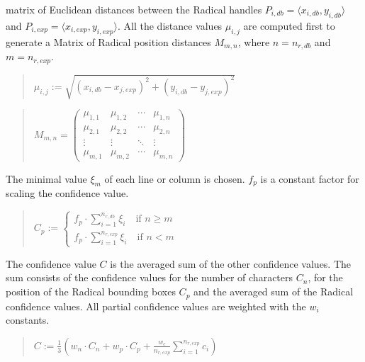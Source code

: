 matrix of Euclidean distances between the Radical handles 
\(P_{i,db} = \langle x_{i,db},y_{i,db} \rangle  \) and 
\(P_{i,exp} = \langle x_{i,exp}, y_{i,exp} \rangle  \). All the distance values \( \mu_{i,j}\) are 
computed first to generate a Matrix of Radical position distances 
\( M_{m,n}\), where
\( n = n_{r,db} \) and \( m = n_{r,exp} \).
\begin{quote}
\(
   \mu_{i,j} := \sqrt{(x_{i,db}-x_{j,exp})^2 + (y_{i,db}-y_{j,exp})^2}
\)
\end{quote}
\begin{quote}
\(
  M_{m,n} = 
  \begin{pmatrix}
   \mu_{1,1} & \mu_{1,2} & \cdots & \mu_{1,n} \\
   \mu_{2,1} & \mu_{2,2} & \cdots & \mu_{2,n} \\
   \vdots  & \vdots  & \ddots & \vdots  \\
   \mu_{m,1} & \mu_{m,2} & \cdots & \mu_{m,n} 
  \end{pmatrix}
\)
\end{quote}
The minimal value \( \xi_m \) of each line or column is chosen.
\( f_p \) is a constant factor for scaling the confidence value.
\begin{quote}
\(
  C_p := 
  \begin{cases}
    f_p \cdot \sum\limits_{i=1}^{n_{r,db}} \xi_i \quad \text{if } n \geq m \\
    f_p \cdot \sum\limits_{i=1}^{n_{r,exp}} \xi_i \quad \text{if } n < m
  \end{cases}
\)
\end{quote}
The confidence value \( C \) is the averaged sum of the other confidence
values. The sum consists of the confidence
values for the number of characters \( C_n\),
for the position of the Radical bounding boxes \( C_p\)
and the averaged sum of the Radical confidence values.
All partial confidence values are weighted with the \(w_i\) constants.
\begin{quote}
\(
    C := \frac{1}{3}
    (w_n \cdot C_n + w_p \cdot C_p + 
     \frac{w_c}{n_{r,exp}} \sum\limits_{i=1}^{n_{r,exp}} c_{i} )
\)
\end{quote}


  

